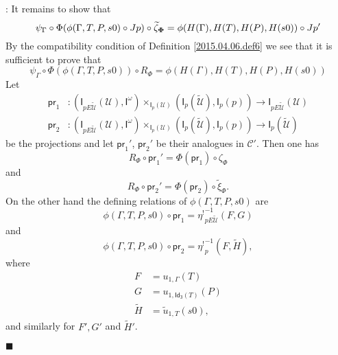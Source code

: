 \documentclass[12pt]{article}
\numberwithin{equation}{section}
\newenvironment{myproof}{{\bf Proof}:}{$\blacksquare$ \vskip 5mm }
\newcommand{\sr}{\rightarrow}
\newcommand{\wt}{\widetilde}
\newcommand{\Idx}{\mathsf{Id_3}} %
\newcommand{\U}{\mathcal{U}}
\newcommand{\I}{\mathsf{I}}
\newcommand{\etashriek}{\eta^!}
\newcommand{\etaunshriek}{{\etashriek}^{-1}}
\newcommand{\pr}{\mathsf{pr}}
\begin{document}
\begin{myproof}
It remains to show that
%
$$\psi_{\Gamma}\circ \Phi(\phi(\Gamma,T,P,s0)\circ Jp)\circ
\wt{\zeta}_{\bf\Phi}=\phi(H(\Gamma),H(T),H(P),H(s0))\circ Jp'$$
%
By the compatibility condition of Definition \ref{2015.04.06.def6} we see that
it is sufficient to prove that
%
$$\psi_{\Gamma}\circ \Phi(\phi(\Gamma,T,P,s0))\circ R_{\Phi} =
\phi(H(\Gamma),H(T),H(P),H(s0))$$
%
Let
%
\begin{align*}
  \pr_1 & :(\I_{pE\wt{\U}}(\U),\I^{\omega})\times_{\I_{p}(\U)}(\I_{p}(\wt{\U}),\I_p(p))\sr \I_{pE\wt{\U}}(\U) \\
  \pr_2 & :(\I_{pE\wt{\U}}(\U),\I^{\omega})\times_{\I_{p}(\U)}(\I_{p}(\wt{\U}),\I_p(p))\sr \I_{p}(\wt{\U})
\end{align*}
%
be the projections and let $\pr_1'$, $\pr_2'$ be their analogues in $\mathcal
C'$. Then one has
%
$$R_{\Phi}\circ \pr_1'=\Phi(\pr_1)\circ \zeta_{\Phi}$$
and
$$R_{\Phi}\circ \pr_2'=\Phi(\pr_2)\circ \wt{\xi}_{\Phi}.$$
%
On the other hand the defining relations of $\phi(\Gamma,T,P,s0)$ are
%
$$\phi(\Gamma,T,P,s0)\circ \pr_1=\etaunshriek_{pE\wt{\U}}(F,G)$$
and
$$\phi(\Gamma,T,P,s0)\circ \pr_2=\etaunshriek_p(F,\wt{H}),$$
%
where
%
\begin{align*}
  F&=u_{1,\Gamma}(T) \\
  G&=u_{1,\Idx(T)}(P)\\
  \wt{H}&=\wt{u}_{1,T}(s0),
\end{align*}
%
and similarly for $F',G'$ and $\wt{H}'$.


\end{myproof}
\end{document}
